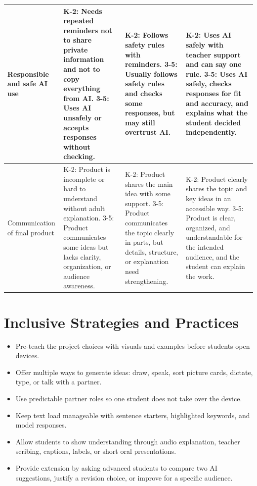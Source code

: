 \documentclass[11pt]{article}
\begin{document}
{\begin{longtable}{|p{}|p{}|p{}|p{}|}
\hline
Responsible and safe AI use &
K-2: Needs repeated reminders not to share private information and not to copy everything from AI. 3-5: Uses AI unsafely or accepts responses without checking. &
K-2: Follows safety rules with reminders. 3-5: Usually follows safety rules and checks some responses, but may still overtrust AI. &
K-2: Uses AI safely with teacher support and can say one rule. 3-5: Uses AI safely, checks responses for fit and accuracy, and explains what the student decided independently. \\
\hline
Communication of final product &
K-2: Product is incomplete or hard to understand without adult explanation. 3-5: Product communicates some ideas but lacks clarity, organization, or audience awareness. &
K-2: Product shares the main idea with some support. 3-5: Product communicates the topic clearly in parts, but details, structure, or explanation need strengthening. &
K-2: Product clearly shares the topic and key ideas in an accessible way. 3-5: Product is clear, organized, and understandable for the intended audience, and the student can explain the work. \\
\hline
\end{longtable}
}

\section*{Inclusive Strategies and Practices}
\begin{itemize}
\item Pre-teach the project choices with visuals and examples before students open devices.
\item Offer multiple ways to generate ideas: draw, speak, sort picture cards, dictate, type, or talk with a partner.
\item Use predictable partner roles so one student does not take over the device.
\item Keep text load manageable with sentence starters, highlighted keywords, and model responses.
\item Allow students to show understanding through audio explanation, teacher scribing, captions, labels, or short oral presentations.
\item Provide extension by asking advanced students to compare two AI suggestions, justify a revision choice, or improve for a specific audience.
\end{itemize}
\end{document}
